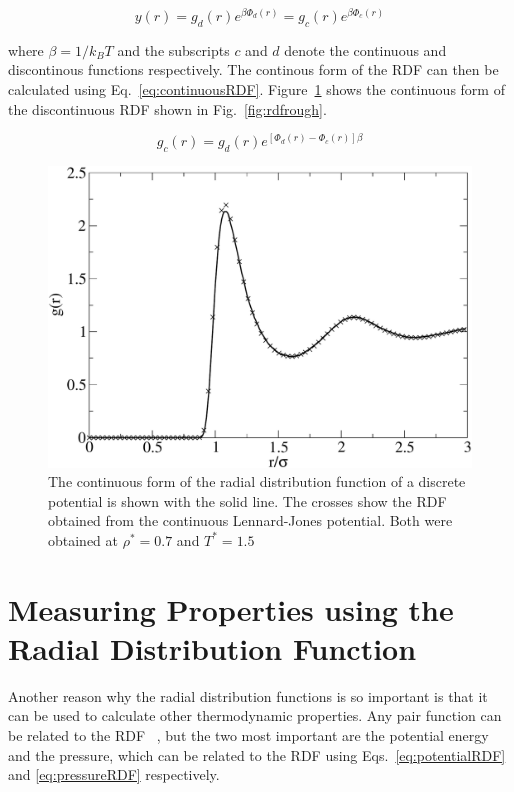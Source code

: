 \documentclass[12pt]{UoAthesis}
\begin{document}
\begin{equation}
\label{eq:ICF}
y(r) = g_d(r)e^{\beta\Phi_d(r)} = g_c(r)e^{\beta\Phi_c(r)}
\end{equation}

where $\beta = 1/k_BT$ and the subscripts $c$ and $d$ denote the
continuous and discontinous functions respectively.  The continous
form of the RDF can then be calculated using
Eq.~\eqref{eq:continuousRDF}.  Figure~\ref{fig:rdfcomp} shows the
continuous form of the discontinuous RDF shown in
Fig.~\ref{fig:rdfrough}.

\begin{equation}
\label{eq:continuousRDF}
g_c(r)=g_d(r)e^{[\Phi_d(r)-\Phi_c(r)]\beta}
\end{equation}

\begin{figure}[htp] 
  \begin{center}
    \includegraphics[clip,width=\textwidth]{figures/rdfcomp} 
    \caption{\label{fig:rdfcomp} The continuous form of the radial
      distribution function of a discrete potential is shown with the
      solid line.  The crosses show the RDF obtained from the
      continuous Lennard-Jones potential.  Both were obtained at $\rho^*=0.7$
      and $T^* = 1.5$}
  \end{center}
\end{figure}

\section{Measuring Properties using the Radial Distribution Function}

Another reason why the radial distribution functions is so important
is that it can be used to calculate other thermodynamic properties.
Any pair function can be related to the RDF ~\cite{Allen1987}, but the
two most important are the potential energy and the pressure, which
can be related to the RDF using Eqs.~\eqref{eq:potentialRDF} and
\eqref{eq:pressureRDF} respectively.
\end{document}

